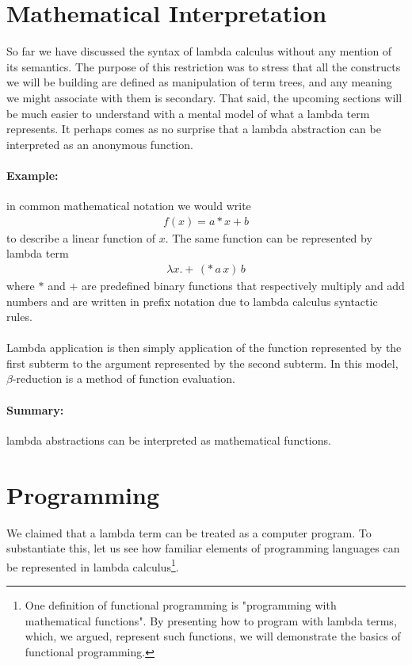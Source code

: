 \documentclass[11pt,twoside,a4paper]{article} %
\begin{document}
\section{Mathematical Interpretation}

So far we have discussed the syntax of lambda calculus without any mention of
its semantics. The purpose of this restriction was to stress that all the
constructs we will be building are defined as manipulation of term trees,
and any meaning we might associate with them is secondary. That said,
the upcoming sections will be much easier to understand with a mental model of
what a lambda term represents. It perhaps comes as no surprise that a lambda
abstraction can be interpreted as an anonymous function. 

\paragraph{Example:} in common mathematical notation we would write 
\begin{align*}
f(x)=a*x+b
\end{align*}
to describe a linear function of $x$. The same function can be represented by 
lambda term 
\begin{align*}
\lambda x.+\,(*\,a\,x)\,b
\end{align*}
where $*$ and $+$ are predefined binary 
functions that respectively multiply and add numbers and are written in prefix
notation due to lambda calculus syntactic rules.
\\\\
Lambda application is then simply application of the function represented by
the first subterm to the argument represented by the second subterm. In this
model, $\beta$-reduction is a method of function evaluation.

\paragraph{Summary:} lambda abstractions can be interpreted as mathematical 
functions.

\section{Programming}

We claimed that a lambda term can be treated as a computer program. To substantiate 
this, let us see how familiar elements of programming languages can be represented 
in lambda calculus\footnote{One definition of functional programming is 
"programming with mathematical functions". By presenting how to program with
lambda terms, which, we argued, represent such functions, we will demonstrate
the basics of functional programming.}.
\end{document}
